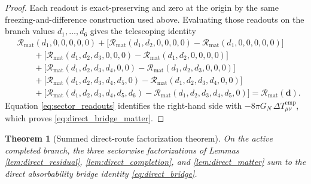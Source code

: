 \documentclass[11pt]{article}
\newcommand{\DeltaTComp}{\Delta T_{\mu\nu}^{\mathrm{cmp}}}
\newcommand{\MatterRead}{\mathscr R_{\mathrm{mat}}}
\newtheorem{theorem}{Theorem}
\begin{document}
\begin{proof}
Each readout is exact-preserving and zero at the origin by the same freezing-and-difference construction used above. Evaluating those readouts on the branch values \(d_1,\ldots,d_6\) gives the telescoping identity
\[
\begin{aligned}
&\MatterRead(d_1,0,0,0,0,0)
+\bigl[\MatterRead(d_1,d_2,0,0,0,0)-\MatterRead(d_1,0,0,0,0,0)\bigr]
\\
&\qquad
+\bigl[\MatterRead(d_1,d_2,d_3,0,0,0)-\MatterRead(d_1,d_2,0,0,0,0)\bigr]
\\
&\qquad
+\bigl[\MatterRead(d_1,d_2,d_3,d_4,0,0)-\MatterRead(d_1,d_2,d_3,0,0,0)\bigr]
\\
&\qquad
+\bigl[\MatterRead(d_1,d_2,d_3,d_4,d_5,0)-\MatterRead(d_1,d_2,d_3,d_4,0,0)\bigr]
\\
&\qquad
+\bigl[\MatterRead(d_1,d_2,d_3,d_4,d_5,d_6)-\MatterRead(d_1,d_2,d_3,d_4,d_5,0)\bigr]
=\MatterRead(\mathbf d).
\end{aligned}
\]
Equation \eqref{eq:sector_readouts} identifies the right-hand side with \(-8\pi G_N\,\DeltaTComp\), which proves \eqref{eq:direct_bridge_matter}.
\end{proof}

\begin{theorem}[Summed direct-route factorization theorem]
\label{thm:direct_factorization}
On the active completed branch, the three sectorwise factorizations of Lemmas \ref{lem:direct_residual}, \ref{lem:direct_completion}, and \ref{lem:direct_matter} sum to the direct absorbability bridge identity \eqref{eq:direct_bridge}.
\end{theorem}
\end{document}
